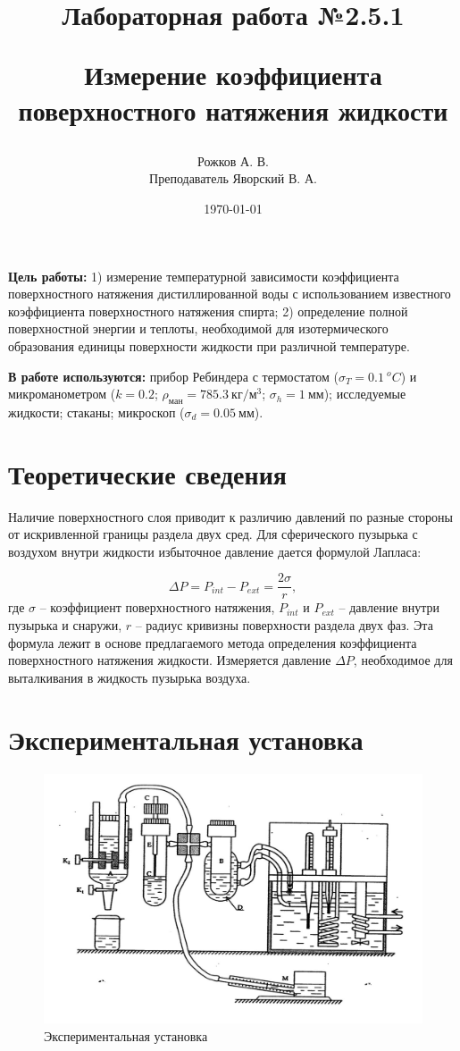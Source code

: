 \documentclass[a4paper, 12pt]{article}
\title{\begin{center}Лабораторная работа №2.5.1\end{center}
Измерение коэффициента поверхностного натяжения жидкости}
\author{Рожков А. В. \\ Преподаватель Яворский В. А.}
\date{\today}
\begin{document}
    \maketitle
    \newpage

    \textbf{Цель работы:} 1) измерение температурной зависимости коэффициента поверхностного натяжения дистиллированной воды с использованием известного коэффициента поверхностного натяжения спирта; 2) определение полной поверхностной энергии и теплоты, необходимой для изотермического образования единицы поверхности жидкости при различной температуре.

	\textbf{В работе используются:} прибор  Ребиндера  с термостатом ($\sigma_T = 0.1~^oC$) и микроманометром ($k = 0.2$; $\rho_{ман} = 785.3~кг/м^3$; $\sigma_h = 1~мм$); исследуемые жидкости; стаканы; микроскоп ($\sigma_d = 0.05~мм$).

    \section{Теоретические сведения}

	Наличие поверхностного слоя приводит к различию давлений по разные стороны от искривленной границы раздела двух сред.  Для сферического пузырька с воздухом  внутри жидкости избыточное давление дается формулой Лапласа:

	\begin{equation}
		\Delta P = P_{int} - P_{ext} = \frac{2\sigma}{r},
		\label{key}
	\end{equation}
	где $ \sigma $ -- коэффициент поверхностного натяжения, $ P_{int} $ и $ P_{ext} $ -- давление внутри пузырька и снаружи, $ r $ -- радиус кривизны поверхности раздела двух фаз. Эта формула лежит в основе предлагаемого метода определения коэффициента поверхностного натяжения жидкости. Измеряется давление $ \Delta P $, необходимое для выталкивания в жидкость пузырька воздуха.

	\section{Экспериментальная установка}

    \begin{figure}[!ht]
        \begin{center}
            \includegraphics[width=0.6 \textwidth]{img/ust.jpg}
        \end{center}
        \caption{Экспериментальная установка}
		\label{img:ust}
    \end{figure}
\end{document}
